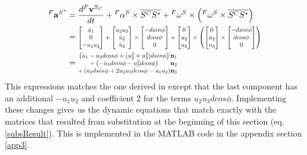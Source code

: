 \documentclass[a4paper,10pt]{article}
\newcommand\scalemath[2]{\scalebox{#1}{\mbox{\ensuremath{\displaystyle #2}}}}
\begin{document}
\begin{align}
 {}^F\mathbf{a}^{S^*} &= \frac{d{}^F\mathbf{v}^{S_C}}{dt} + {}^F\alpha^S \times \overline{S^CS^*} + {}^F\omega^S \times \left( {}^F\omega^S \times \overline{S^CS^*} \right) \nonumber \\
 &= \scalemath{0.75}{
 \left[\begin{matrix} \dot{u}_1 \\ 0 \\ -u_1u_2 \end{matrix}\right]
 +\left[\begin{matrix} u_2u_3 \\ \dot{u}_2 \\ \dot{u}_3 \end{matrix}\right] \times \left[\begin{matrix} -dsin\phi \\ dcos\phi \\ 0 \end{matrix}\right]
 +\left[\begin{matrix} 0 \\ u_2 \\ u_3 \end{matrix}\right] \times \left(\left[\begin{matrix} 0 \\ u_2 \\ u_3 \end{matrix}\right] \times \left[\begin{matrix} -dsin\phi \\ dcos\phi \\ 0 \end{matrix}\right] \right)
 }\nonumber \\
 &= \scalemath{0.75}{\begin{matrix} 
  \left( \dot{u}_1 - \dot{u}_3dcos\phi +  (u_2^2 + u_3^2)dsin\phi \right)  \\
  +\left( -\dot{u}_3dsin\phi - u_3^2dcos\phi   \right)  \\
  +\left(\dot{u}_2dsin\phi + 2u_2u_3dcos\phi - u_1u_2   \right) 
 \end{matrix}
 \begin{matrix} \mathbf{n}_1 \\ \mathbf{n}_2 \\ \mathbf{n}_3 \end{matrix}} \label{correctedAcc}
\end{align}
This expressions matches the one derived in \cite[eq.~10]{kim2005dynamic} except that the last component has an additional 
$- u_1u_2$ and coefficient $2$ for the terms $u_2u_3dcos\phi$. Implementing these changes gives us the dynamic equations that match
exactly with the matrices that resulted from substitution at the beginning of this section (eq.\ref{subsResult}). This is implemented in the MATLAB code
in the appendix section \ref{app3}.
\end{document}
